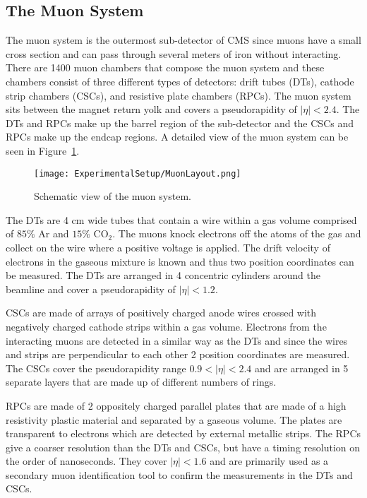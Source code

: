 \subsection{The Muon System}

The muon system is the outermost sub-detector of CMS since muons have a small cross section and can pass through several meters of iron without interacting. There are 1400 muon chambers that compose the muon system and these chambers consist of three different types of detectors: drift tubes (DTs), cathode strip chambers (CSCs), and resistive plate chambers (RPCs). The muon system sits between the magnet return yolk and covers a pseudorapidity of $|\eta| < 2.4$. The DTs and RPCs make up the barrel region of the sub-detector and the CSCs and RPCs make up the endcap regions. A detailed view of the muon system can be seen in Figure~\ref{fig:MuonSchematic}\cite{CMSExperiment}.

\begin{figure}[htbp]
\texttt{[image: ExperimentalSetup/MuonLayout.png]}
\caption{Schematic view of the muon system.}
\label{fig:MuonSchematic}
\end{figure}

The DTs are 4 cm wide tubes that contain a wire within a gas volume comprised of $85\%$ Ar and $15\%$ $\mathrm{CO}_{2}$. The muons knock electrons off the atoms of the gas and collect on the wire where a positive voltage is applied. The drift velocity of electrons in the gaseous mixture is known and thus two position coordinates can be measured. The DTs are arranged in 4 concentric cylinders around the beamline and cover a pseudorapidity of $|\eta| < 1.2$. 

CSCs are made of arrays of positively charged anode wires crossed with negatively charged cathode strips within a gas volume. Electrons from the interacting muons are detected in a similar way as the DTs and since the wires and strips are perpendicular to each other 2 position coordinates are measured. The CSCs cover the pseudorapidity range $0.9 < |\eta| < 2.4$ and are arranged in 5 separate layers that are made up of different numbers of rings.

RPCs are made of 2 oppositely charged parallel plates that are made of a high resistivity plastic material and separated by a gaseous volume. The plates are transparent to electrons which are detected by external metallic strips. The RPCs give a coarser resolution than the DTs and CSCs, but have a timing resolution on the order of nanoseconds. They cover $|\eta| < 1.6$ and are primarily used as a secondary muon identification tool to confirm the measurements in the DTs and CSCs. 

